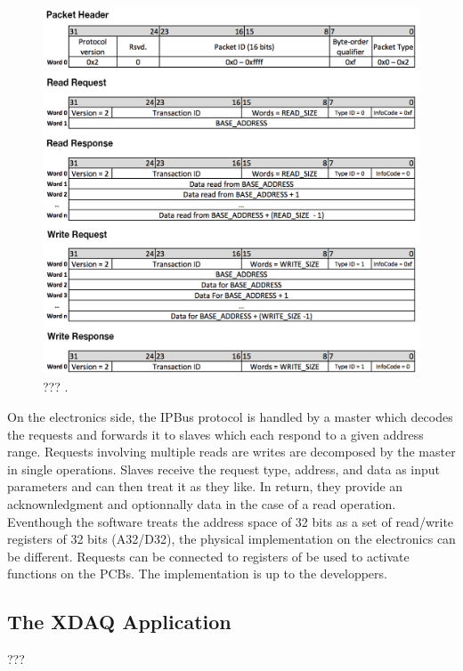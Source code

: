       \begin{figure}[h!]
        \centering
        \includegraphics[width=\textwidth]{img/II-2-daq/ipbus.png}
        \caption{??? \cite{AMC13}.}
        \label{fig:II-2-daq-ipbus}
      \end{figure}

      On the electronics side, the IPBus protocol is handled by a master which decodes the requests and forwards it to slaves which each respond to a given address range. Requests involving multiple reads are writes are decomposed by the master in single operations. Slaves receive the request type, address, and data as input parameters and can then treat it as they like. In return, they provide an acknownledgment and optionnally data in the case of a read operation. Eventhough the software treats the address space of 32 bits as a set of read/write registers of 32 bits (A32/D32), the physical implementation on the electronics can be different. Requests can be connected to registers of be used to activate functions on the PCBs. The implementation is up to the developpers.

    \subsection{The XDAQ Application}

      ???


